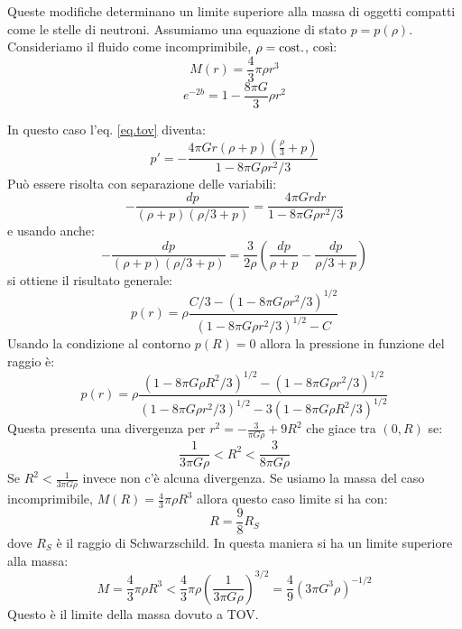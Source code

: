 Queste modifiche determinano un limite superiore alla massa di oggetti compatti come le stelle di neutroni. Assumiamo una equazione di stato $p=p(\rho)$. Consideriamo il fluido come incomprimibile, $\rho = \textrm{cost.}$, così:
\begin{equation*}
    M(r) = \frac{4}{3}\pi \rho r^3
\end{equation*}
\begin{equation*}
    e^{-2b} = 1 - \frac{8\pi G}{3}\rho r^2
\end{equation*}

In questo caso l'eq. \ref{eq.tov} diventa:
\begin{equation*}
    p' = - \frac{4\pi G r(\rho +p)(\frac{\rho}{3}+p)}{1 - 8\pi G\rho r^2/3}
\end{equation*}
Può essere risolta con separazione delle variabili:
\begin{equation*}
     -\frac{dp}{(\rho + p)(\rho/3 +p)} = \frac{4\pi G rdr}{1 - 8\pi G\rho r^2/3}
\end{equation*}
e usando anche:
\begin{equation*}
    -\frac{dp}{(\rho + p)(\rho/3 + p)} = \frac{3}{2\rho} \left( \frac{dp}{\rho + p} - \frac{dp}{\rho/3+p}\right)
\end{equation*}
si ottiene il risultato generale:
\begin{equation*}
    p(r) = \rho \frac{C/3 -(1-8\pi G\rho r^2/3)^{1/2}}{(1 - 8\pi G\rho r^2/3)^{1/2} - C}
\end{equation*}
Usando la condizione al contorno $p(R) = 0$ allora la pressione in funzione del raggio è:
\begin{equation}
    p(r) = \rho \frac{(1-8\pi G\rho R^2/3)^{1/2} - (1-8\pi G\rho r^2/3)^{1/2}}{(1-8\pi G\rho r^2/3)^{1/2}- 3(1-8\pi G\rho R^2/3)^{1/2}}
    \label{eq.p_incomprim_stellare}
\end{equation}
Questa presenta una divergenza per $r^2 = - \frac{3}{\pi G \rho} + 9R^2$ che giace tra $(0,R)$ se:
\begin{equation*}
    \frac{1}{3\pi G\rho} < R^2 < \frac{3}{8\pi G \rho}
\end{equation*}
Se $R^2 < \frac{1}{3\pi G\rho}$ invece non c'è alcuna divergenza. Se usiamo la massa del caso incomprimibile, $M(R)= \frac{4}{3}\pi \rho R^3$ allora questo caso limite si ha con:
\begin{equation*}
    R= \frac{9}{8}R_S
\end{equation*}
dove $R_S$ è il raggio di Schwarzschild. In questa maniera si ha un limite superiore alla massa:
\begin{equation}
    M = \frac{4}{3}\pi\rho R^3 < \frac{4}{3}\pi \rho \left(\frac{1}{3\pi G\rho}\right)^{3/2} = \frac{4}{9}(3\pi G^3\rho)^{-1/2}
    \label{eq.limite_tov}
\end{equation}
Questo è il limite della massa dovuto a TOV.